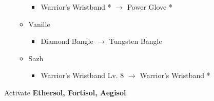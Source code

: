 \begin{menu}
\begin{itemize}
\begin{itemize}
\begin{itemize}
            \item Warrior's Wristband * $\rightarrow$ Power Glove *
        \end{itemize}
        \item Vanille
        \begin{itemize}
            \item Diamond Bangle $\rightarrow$ Tungsten Bangle
        \end{itemize}
        \item Sazh
        \begin{itemize}
            \item Warrior's Wristband Lv. 8 $\rightarrow$ Warrior's Wristband *
        \end{itemize}
    \end{itemize}
\end{itemize}
\end{menu}
Activate \textbf{Ethersol, Fortisol, Aegisol}.
\renewcommand{\first}{[1] Aggression (\rav/\com/\com)}
\renewcommand{\second}{[2] Cerberus (\com/\com/\com)}
\renewcommand{\third}{[3] Mystic Tower (\rav/\sen/\rav)}
\renewcommand{\fourth}{[4] Solidarity (\com/\sen/\med)}
\renewcommand{\fifth}{[5] Relentless Assault (\rav/\com/\rav)}
\renewcommand{\sixth}{[6] Tri-Disaster (\rav/\rav/\rav)}

